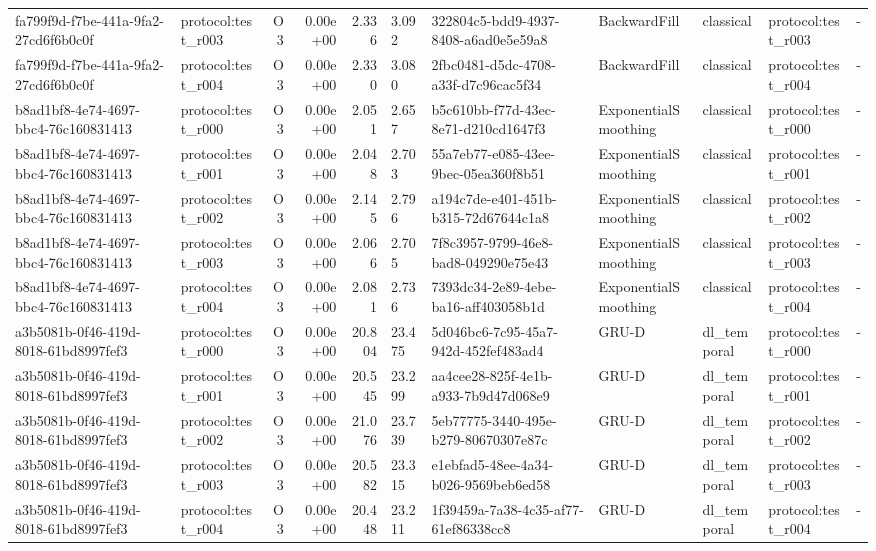 \begin{table}[htbp]
\begin{tabular}{llrrr}
fa799f9d-f7be-441a-9fa2-27cd6f6b0c0f & protocol:test\_r003 & O3 & 0.00e+00 & 2.336 & 3.092 & 322804c5-bdd9-4937-8408-a6ad0e5e59a8 & BackwardFill & classical & protocol:test\_r003 & - \\
fa799f9d-f7be-441a-9fa2-27cd6f6b0c0f & protocol:test\_r004 & O3 & 0.00e+00 & 2.330 & 3.080 & 2fbc0481-d5dc-4708-a33f-d7c96cac5f34 & BackwardFill & classical & protocol:test\_r004 & - \\
b8ad1bf8-4e74-4697-bbc4-76c160831413 & protocol:test\_r000 & O3 & 0.00e+00 & 2.051 & 2.657 & b5c610bb-f77d-43ec-8e71-d210cd1647f3 & ExponentialSmoothing & classical & protocol:test\_r000 & - \\
b8ad1bf8-4e74-4697-bbc4-76c160831413 & protocol:test\_r001 & O3 & 0.00e+00 & 2.048 & 2.703 & 55a7eb77-e085-43ee-9bec-05ea360f8b51 & ExponentialSmoothing & classical & protocol:test\_r001 & - \\
b8ad1bf8-4e74-4697-bbc4-76c160831413 & protocol:test\_r002 & O3 & 0.00e+00 & 2.145 & 2.796 & a194c7de-e401-451b-b315-72d67644c1a8 & ExponentialSmoothing & classical & protocol:test\_r002 & - \\
b8ad1bf8-4e74-4697-bbc4-76c160831413 & protocol:test\_r003 & O3 & 0.00e+00 & 2.066 & 2.705 & 7f8c3957-9799-46e8-bad8-049290e75e43 & ExponentialSmoothing & classical & protocol:test\_r003 & - \\
b8ad1bf8-4e74-4697-bbc4-76c160831413 & protocol:test\_r004 & O3 & 0.00e+00 & 2.081 & 2.736 & 7393dc34-2e89-4ebe-ba16-aff403058b1d & ExponentialSmoothing & classical & protocol:test\_r004 & - \\
a3b5081b-0f46-419d-8018-61bd8997fef3 & protocol:test\_r000 & O3 & 0.00e+00 & 20.804 & 23.475 & 5d046bc6-7c95-45a7-942d-452fef483ad4 & GRU-D & dl\_temporal & protocol:test\_r000 & - \\
a3b5081b-0f46-419d-8018-61bd8997fef3 & protocol:test\_r001 & O3 & 0.00e+00 & 20.545 & 23.299 & aa4cee28-825f-4e1b-a933-7b9d47d068e9 & GRU-D & dl\_temporal & protocol:test\_r001 & - \\
a3b5081b-0f46-419d-8018-61bd8997fef3 & protocol:test\_r002 & O3 & 0.00e+00 & 21.076 & 23.739 & 5eb77775-3440-495e-b279-80670307e87c & GRU-D & dl\_temporal & protocol:test\_r002 & - \\
a3b5081b-0f46-419d-8018-61bd8997fef3 & protocol:test\_r003 & O3 & 0.00e+00 & 20.582 & 23.315 & e1ebfad5-48ee-4a34-b026-9569beb6ed58 & GRU-D & dl\_temporal & protocol:test\_r003 & - \\
a3b5081b-0f46-419d-8018-61bd8997fef3 & protocol:test\_r004 & O3 & 0.00e+00 & 20.448 & 23.211 & 1f39459a-7a38-4c35-af77-61ef86338cc8 & GRU-D & dl\_temporal & protocol:test\_r004 & - \\

\end{tabular}
\end{table}
